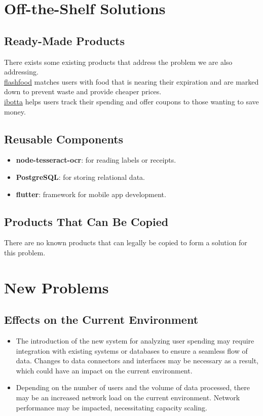 \documentclass[12pt]{article}
\begin{document}
\section{Off-the-Shelf Solutions}
\subsection{Ready-Made Products}
There exists some existing products that address the problem we are also addressing. \\

\href{https://www.flashfood.com/}{flashfood} matches users with food that is nearing their expiration and are marked down to prevent waste and provide cheaper prices.\\

\href{https://home.ibotta.com/}{ibotta} helps users track their spending and offer coupons to those wanting to save money.\\

\subsection{Reusable Components}
\begin{itemize}
  \item \textbf{node-tesseract-ocr}: for reading labels or receipts.
  \item \textbf{PostgreSQL}: for storing relational data.
  \item \textbf{flutter}: framework for mobile app development.
\end{itemize}

\subsection{Products That Can Be Copied}
There are no known products that can legally be copied to form a solution for this problem.

\section{New Problems}
\subsection{Effects on the Current Environment}
\begin{itemize}
    \item The introduction of the new system for analyzing user spending may require integration with existing systems or databases to ensure a seamless flow of data. Changes to data connectors and interfaces may be necessary as a result, which could have an impact on the current environment.
    \item Depending on the number of users and the volume of data processed, there may be an increased network load on the current environment. Network performance may be impacted, necessitating capacity scaling.
\end{itemize}
\end{document}
